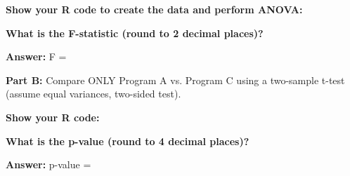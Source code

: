 \documentclass[11pt]{article}
\begin{document}
\textbf{Show your R code to create the data and perform ANOVA:}

\vspace{5cm}

\textbf{What is the F-statistic (round to 2 decimal places)?}

\vspace{0.3cm}

\textbf{Answer:} F = \underline{\hspace{3cm}}

\vspace{0.5cm}

\textbf{Part B:} Compare ONLY Program A vs. Program C using a two-sample t-test (assume equal variances, two-sided test).

\vspace{0.3cm}

\textbf{Show your R code:}

\vspace{4cm}

\textbf{What is the p-value (round to 4 decimal places)?}

\vspace{0.3cm}

\textbf{Answer:} p-value = \underline{\hspace{3cm}}

\vspace{1cm}
\end{document}
